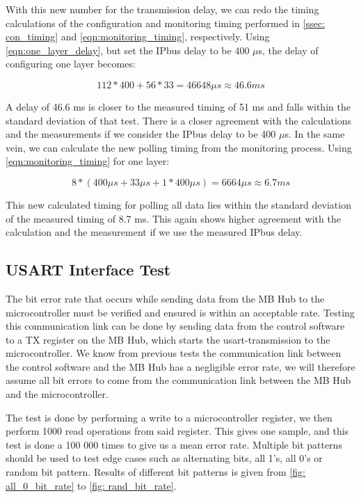\documentclass[main.tex]{subfiles}
\begin{document}
With this new number for the transmission delay, we can redo the timing calculations of the configuration and monitoring timing performed in \autoref{ssec: con_timing} and \autoref{eqn:monitoring_timing}, respectively. Using \autoref{eqn:one_layer_delay}, but set the IPbus delay to be 400 $\mu$s, the delay of configuring one layer becomes:

\begin{equation} \label{eqn:new_one_layer_delay}
112 * 400 + 56*33 =  46648\mu s \approx 46.6 ms
\end{equation}

A delay of 46.6 ms is closer to the measured timing of 51 ms and falls within the standard deviation of that test. There is a closer agreement with the calculations and the measurements if we consider the IPbus delay to be 400 $\mu$s. In the same vein, we can calculate the new polling timing from the monitoring process. Using \autoref{eqn:monitoring_timing} for one layer:

\begin{equation} \label{eqn:new_monitoring_timing}
8*(400\mu s + 33 \mu s + 1*400\mu s) = 6664 \mu s \approx 6.7 ms
\end{equation}

This new calculated timing for polling all data lies within the standard deviation of the measured timing of 8.7 ms. This again shows higher agreement with the calculation and the measurement if we use the measured IPbus delay.



\subsection{USART Interface Test}

\label{ssec: bit_error}
The bit error rate that occurs while sending data from the MB Hub to the microcontroller must be verified and ensured is within an acceptable rate. Testing this communication link can be done by sending data from the control software to a TX register on the MB Hub, which starts the \gls{usart}-transmission to the microcontroller. We know from previous tests the communication link between the control software and the MB Hub has a negligible error rate, we will therefore assume all bit errors to come from the communication link between the MB Hub and the microcontroller.

The test is done by performing a write to a microcontroller register, we then perform 1000 read operations from said register. This gives one sample, and this test is done a 100 000 times to give us a mean error rate. Multiple bit patterns should be used to test edge cases such as alternating bits, all 1's, all 0's or random bit pattern. Results of different bit patterns is given from \autoref{fig: all_0_bit_rate} to \ref{fig: rand_bit_rate}.
\end{document}

